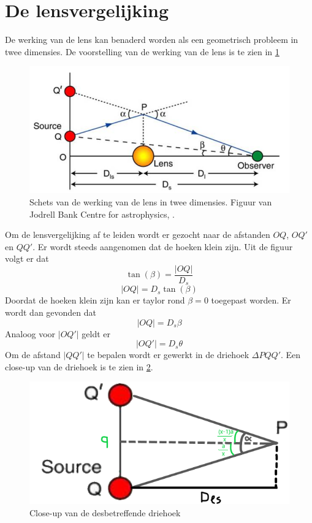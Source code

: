 \section{De lensvergelijking}
\label{appendix:lensvergelijking}
De werking van de lens kan benaderd worden als een geometrisch probleem in twee dimensies. De voorstelling van de werking van de lens is te zien in \cref{fig:lensvgl}
\begin{figure}[H]
    \centering
    \includegraphics[scale=0.5]{Figures/Lensvergelijking.png}
    \caption{Schets van de werking van de lens in twee dimensies. Figuur van Jodrell Bank Centre for astrophysics, \cite{jodrell-bank-centre-for-astrophysics-no-date}.}
    \label{fig:lensvgl}
\end{figure}\mbox{}
Om de lensvergelijking af te leiden wordt er gezocht naar de afstanden $OQ$, $OQ'$ en $QQ'$. Er wordt steeds aangenomen dat de hoeken klein zijn. Uit de figuur volgt er dat
$$\tan(\beta) = \frac{|OQ|}{D_{s}}$$
$$|OQ| = D_{s}\tan(\beta)$$
Doordat de hoeken klein zijn kan er taylor rond $\beta=0$ toegepast worden. Er wordt dan gevonden dat
\begin{equation}
  |OQ| = D_{s}\beta  
  \label{for:OQ}
\end{equation}
Analoog voor $|OQ'|$ geldt er
\begin{equation}
   |OQ'| = D_{s}\theta 
   \label{for:OQ'}
\end{equation}
Om de afstand $|QQ'|$ te bepalen wordt er gewerkt in de driehoek $\Delta PQQ'$. Een close-up van de driehoek is te zien in \cref{fig:driehoek}.
\begin{figure}[h]
    \centering
    \includegraphics[scale=0.45]{Figures/driehoek.png}
    \caption{Close-up van de desbetreffende driehoek}
    \label{fig:driehoek}
\end{figure}
